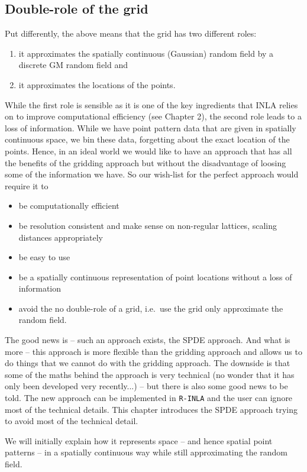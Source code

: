 \subsection{Double-role of the grid}
Put differently, the above means that the grid has two different roles: 
\begin{enumerate}
\item it approximates the spatially continuous (Gaussian) random field by a discrete GM random field and
\item it approximates the locations of the points.
\end{enumerate}
While the first role is sensible as it is one of the key ingredients that INLA relies on to improve computational efficiency (see Chapter 2), the second role leads to a loss of information. While we have point pattern data that are given in spatially continuous space, we bin these data, forgetting about the exact location of the points. 
Hence, in an ideal world we would like to have an approach that has all the benefits of the gridding approach but without the disadvantage of loosing some of the information we have. So our wish-list for the perfect approach would require it to 
\begin{itemize}
\item be computationally efficient
\item be resolution consistent and make sense on non-regular lattices, scaling distances appropriately
\item be easy to use
\item be a spatially continuous representation of point locations without a loss of information
\item avoid the no double-role of a grid, i.e.\ use the grid only approximate the random field.
\end{itemize}

The good news is -- such an approach exists, the SPDE approach. And what is more -- this approach is more flexible than the gridding approach and allows us to do things that we cannot do with the gridding approach. The downside is that some of the maths behind the approach is very technical (no wonder that it has only been developed very recently...) -- but there is also some good news to be told. The new approach can be implemented in \texttt{R-INLA} and the user can ignore most of the technical details.  This chapter introduces the SPDE approach trying to avoid most of the technical detail. 

We will initially explain how it represents space -- and hence spatial point patterns -- in a spatially continuous way while still approximating the random field.

